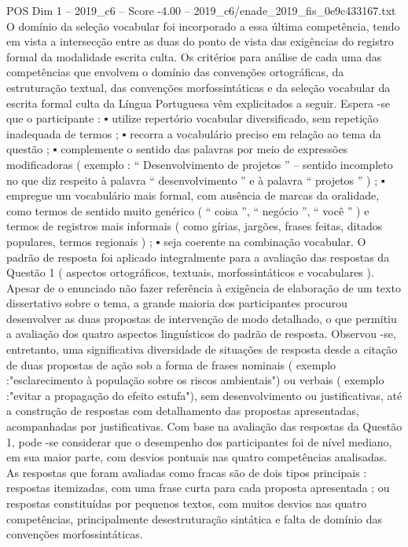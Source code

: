 \begin{textsample}{POS Dim 1 – 2019\_c6 – Score -4.00 – 2019\_c6/enade\_2019\_fis\_0e9c433167.txt}
O domínio da seleção vocabular foi incorporado a essa última competência, tendo em vista a intersecção entre as duas do ponto de vista das exigências do registro formal da modalidade escrita culta.
Os critérios para análise de cada uma das competências que envolvem o domínio das convenções ortográficas, da estruturação textual, das convenções morfossintáticas e da seleção vocabular da escrita formal culta da Língua Portuguesa vêm explicitados a seguir.
Espera -se que o participante : {\EmojiFont ▪} utilize repertório vocabular diversificado, sem repetição inadequada de termos ; {\EmojiFont ▪} recorra a vocabulário preciso em relação ao tema da questão ; {\EmojiFont ▪} complemente o sentido das palavras por meio de expressões modificadoras ( exemplo : “ Desenvolvimento de projetos ” – sentido incompleto no que diz respeito à palavra “ desenvolvimento ” e à palavra “ projetos ” ) ; {\EmojiFont ▪} empregue um vocabulário mais formal, com ausência de marcas da oralidade, como termos de sentido muito genérico ( “ coisa ”, “ negócio ”, “ você ” ) e termos de registros mais informais ( como gírias, jargões, frases feitas, ditados populares, termos regionais ) ; {\EmojiFont ▪} seja coerente na combinação vocabular.
O padrão de resposta foi aplicado integralmente para a avaliação das respostas da Questão 1 ( aspectos ortográficos, textuais, morfossintáticos e vocabulares ).
Apesar de o enunciado não fazer referência à exigência de elaboração de um texto dissertativo sobre o tema, a grande maioria dos participantes procurou desenvolver as duas propostas de intervenção de modo detalhado, o que permitiu a avaliação dos quatro aspectos linguísticos do padrão de resposta.
Observou -se, entretanto, uma significativa diversidade de situações de resposta desde a citação de duas propostas de ação sob a forma de frases nominais ( exemplo :"esclarecimento à população sobre os riscos ambientais") ou verbais ( exemplo :"evitar a propagação do efeito estufa"), sem desenvolvimento ou justificativas, até a construção de respostas com detalhamento das propostas apresentadas, acompanhadas por justificativas.
Com base na avaliação das respostas da Questão 1, pode -se considerar que o desempenho dos participantes foi de nível mediano, em sua maior parte, com desvios pontuais nas quatro competências analisadas.
As respostas que foram avaliadas como fracas são de dois tipos principais : respostas itemizadas, com uma frase curta para cada proposta apresentada ; ou respostas constituídas por pequenos textos, com muitos desvios nas quatro competências, principalmente desestruturação sintática e falta de domínio das convenções morfossintáticas.

\end{textsample}
